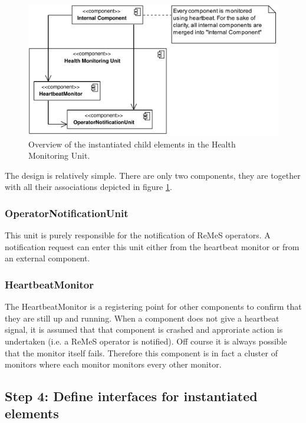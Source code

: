 \begin{figure}[H]
	\begin{centering}
		\includegraphics[width=\textwidth]{figs/add-it9-elements.pdf}
		\caption{Overview of the instantiated child elements in the Health Monitoring
		Unit.}
		\label{fig:it9/elements}
	\end{centering}
\end{figure}

\npar The design is relatively simple. There are only two components, they are
together with all their associations depicted in figure \ref{fig:it9/elements}.

\subsubsection{OperatorNotificationUnit}

\npar This unit is purely responsible for the notification of ReMeS operators. A
notification request can enter this unit either from the heartbeat monitor or
from an external component.

\subsubsection{HeartbeatMonitor}

\npar The HeartbeatMonitor is a registering point for other components to
confirm that they are still up and running. When a component does not give a
heartbeat signal, it is assumed that that component is crashed and approriate
action is undertaken (i.e. a ReMeS operator is notified). Off course it is
always possible that the monitor itself fails. Therefore this component is in
fact a cluster of monitors where each monitor monitors every other monitor.

\subsection{Step 4: Define interfaces for instantiated elements}
\label{add:it9/interfaces}

